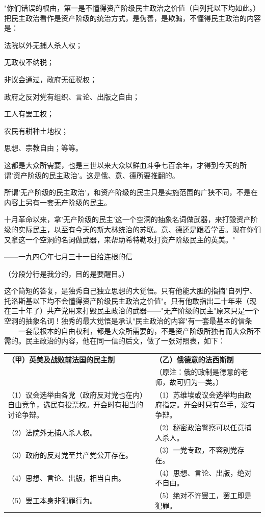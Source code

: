 \documentclass[
  openany,           %
  12pt,              %
  a4paper            %
]{ctexbook}
\newcommand{\fang}{\CJKfamily{fang}}
\newenvironment{quoteindent}
  {\list{}{\leftmargin=4em\rightmargin=0pt}\item\relax\fang\small}
  {\endlist}
\begin{document}
\begin{quoteindent}
"你们错误的根由，第一是不懂得资产阶级民主政治之价值（自列托以下均如此。）把民主政治看作是资产阶级的统治方式，是伪善，是欺骗，不懂得民主政治的内容是：

法院以外无捕人杀人权；

无政权不纳税；

非议会通过，政府无征税权；

政府之反对党有组织、言论、出版之自由；

工人有罢工权；

农民有耕种土地权；

思想、宗教自由；等等。

这都是大众所需要，也是三世以来大众以鲜血斗争七百余年，才得到今天的所谓'资产阶级的民主政治'。这是俄、意、德所要推翻的。

所谓'无产阶级的民主政治'，和资产阶级的民主只是实施范围的广狭不同，不是在内容上另有一套无产阶级的民主。

十月革命以来，拿'无产阶级的民主'这一个空洞的抽象名词做武器，来打毁资产阶级的实际民主，以至有今天的斯大林统治的苏联。意、德还是跟着学舌。现在你们又拿这一个空洞的名词做武器，来帮助希特勒攻打资产阶级民主的英美。"
\end{quoteindent}

\hfill ——一九四〇年七月三十一日给连根的信

（分段分行是我分的，目的是要醒目。）

这个简短的答复，是独秀自己独立思想的大觉悟。只有他能大胆的指摘"自列宁、托洛斯基以下均不会懂得资产阶级民主政治之价值"。只有他敢指出二十年来（现在三十年了）共产党用来打毁民主政治的武器——"无产阶级的民主"原来只是一个空洞的抽象名词！独秀的最大觉悟是承认"民主政治的内容"有一套最基本的信条——一套最根本的自由权利，都是大众所需要的，不是资产阶级所独有而大众所不需的。民主政治的内容，他在同一信的后文，做了一张对照表，如下：

\begin{center}
\small
\begin{tabularx}{\textwidth}{|X|X|}
\hline
\textbf{（甲）英美及战败前法国的民主制} & \textbf{（乙）俄德意的法西斯制} \\
& \small（原注：俄的政制是德意的老师，故可归为一类。）\\
\hline
（1）议会选举由各党（政府反对党也在内）自由竞争，选民有投票权。开会时有相当的讨论争辩。 & （1）苏维埃或议会选举均由政府指定。开会时只有举手，没有争辩。 \\
\hline
（2）法院外无捕人杀人权。 & （2）秘密政治警察可以任意捕人杀人。 \\
\hline
（3）政府的反对党至共产党公开存在。 & （3）一党专政，不容别党存在。 \\
\hline
（4）思想、言论、出版，相当自由。 & （4）思想、言论、出版，绝对不自由。 \\
\hline
（5）罢工本身非犯罪行为。 & （5）绝对不许罢工，罢工即是犯罪。 \\
\hline
\end{tabularx}
\end{center}
\end{document}
